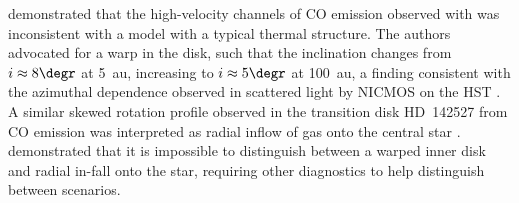 \documentclass[11pt]{article}
\begin{document}
\citet{2015ApJ...807....2C} demonstrated that the high-velocity channels of CO 
emission observed with \citep{Cleeves_ea_2015a} was inconsistent with a model 
with a typical thermal structure. The authors advocated for a warp in the disk, 
such that the inclination changes from $i \approx 8\degr$ at 5~au, increasing 
to $i \approx 5\degr$ at 100~au, a finding consistent with the azimuthal 
dependence observed in scattered light by NICMOS on the \gls{HST} 
\citep{2015ApJ...799..204C}. A similar skewed rotation profile observed in the
 transition disk HD~142527 from CO emission was interpreted as radial inflow 
 of gas onto the central star \citep{1994A&A...291..943O, Cleeves_ea_2015a}. 
 \citet{2015ApJ...799..204C} demonstrated that it is impossible to distinguish 
 between a warped inner disk and radial in-fall onto the star, requiring other 
 diagnostics to help distinguish between scenarios.


\end{document}
